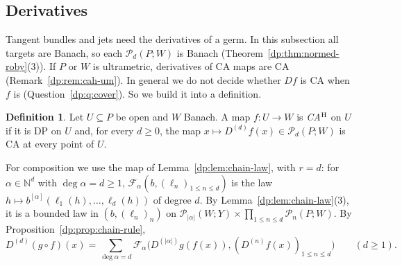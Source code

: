\documentclass[11pt]{amsart}
\theoremstyle{definition}
\newtheorem{definition}[theorem]{Definition}
\theoremstyle{remark}
\numberwithin{equation}{section}
\newcommand{\N}{\mathbb N}
\newcommand{\abs}[1]{\lvert #1\rvert}
\theoremstyle{plain}
\theoremstyle{definition}
\theoremstyle{plain}
\newcommand{\cP}{\mathcal P}
\begin{document}
\subsection{Derivatives}\label{dp:ssec:ca-derivatives}

Tangent bundles and jets need the derivatives of a germ. In this subsection all targets are Banach, so each $\cP_d(P;W)$ is Banach (Theorem~\ref{dp:thm:normed-roby}(3)). If $P$ or $W$ is ultrametric, derivatives of CA maps are CA (Remark~\ref{dp:rem:cah-um}). In general we do not decide whether $Df$ is CA when $f$ is (Question~\ref{dp:q:cover}). So we build it into a definition.

\begin{definition}\label{dp:def:cah}
Let $U\subseteq P$ be open and $W$ Banach. A map $f\colon U\to W$ is \emph{CA$^{\rm H}$} on $U$ if it is DP on $U$ and, for every $d\ge0$, the map $x\mapsto D^{(d)}f(x)\in\cP_d(P;W)$ is CA at every point of $U$.
\end{definition}

For composition we use the map of Lemma~\ref{dp:lem:chain-law}, with $r=d$: for $\alpha\in\N^d$ with $\deg\alpha=d\ge1$, $\mathcal F_\alpha(b,(\ell_n)_{1\le n\le d})$ is the law $h\mapsto b^{[\alpha]}(\ell_1(h),\dots,\ell_d(h))$ of degree $d$. By Lemma~\ref{dp:lem:chain-law}(3), it is a bounded law in $(b,(\ell_n)_n)$ on $\cP_{\abs\alpha}(W;Y)\times\prod_{1\le n\le d}\cP_n(P;W)$. By Proposition~\ref{dp:prop:chain-rule},
\begin{equation}\label{dp:eq:ca-chain}
 D^{(d)}(g\circ f)(x)=\sum_{\deg\alpha=d}\mathcal F_\alpha\bigl(D^{(\abs\alpha)}g(f(x)),(D^{(n)}f(x))_{1\le n\le d}\bigr)\qquad(d\ge1).
\end{equation}
\end{document}
